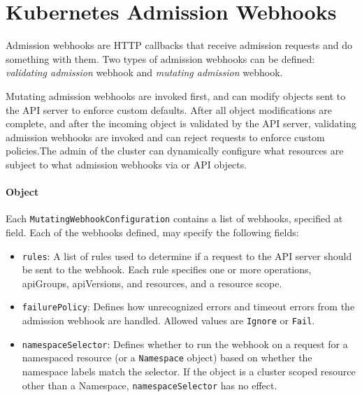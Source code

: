 \section{Kubernetes Admission Webhooks}

Admission webhooks are HTTP callbacks that receive admission requests and do
something with them. Two types of admission webhooks can be defined:
\textit{validating admission} webhook and \textit{mutating admission} webhook.

Mutating admission webhooks are invoked first, and can modify objects sent to
the API server to enforce custom defaults. After all object modifications are
complete, and after the incoming object is validated by the API server,
validating admission webhooks are invoked and can reject requests to enforce
custom policies.The admin of the cluster can dynamically configure what
resources are subject to what admission webhooks via
 or  API
objects.

\paragraph*{ Object}

Each \texttt{MutatingWebhookConfiguration} contains a list of webhooks,
specified at  field. Each of the webhooks defined, may specify the
following fields:
\begin{itemize}
      \tightlist
      \item \texttt{rules}: A list of rules used to determine if a request to
            the API server should be sent to the webhook. Each rule specifies
            one or more operations, apiGroups, apiVersions, and resources, and a
            resource scope.
      \item  \texttt{failurePolicy}: Defines how unrecognized errors and timeout
            errors from the admission webhook are handled. Allowed values are
            \texttt{Ignore} or \texttt{Fail}.
      \item \texttt{namespaceSelector}:  Defines whether to run the webhook on a
            request for a namespaced resource (or a \texttt{Namespace} object) based
            on whether the namespace labels match the selector. If the object is a
            cluster scoped resource other than a Namespace, \texttt{namespaceSelector}
            has no effect.
\end{itemize}